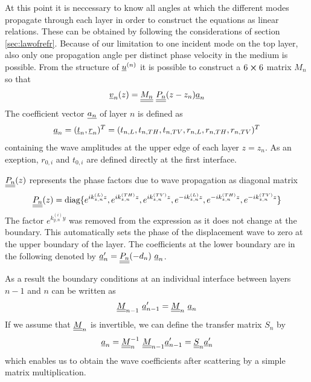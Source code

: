 At this point it is neccessary to know all angles at which the different modes
propagate through each layer in order to construct the equations as linear
relations. These can be obtained by following the considerations of section
\ref{sec:lawofrefr}.  Because of our limitation to one incident mode on the top
layer, also only one propagation angle per distinct phase velocity in the
medium is possible. From the structure of
$\underline{u}^{(n)}$ it is possible to construct a $6\cross6$ matrix $M_n$ so that
\begin{equation}
    \uline{v}_n(z) = \uuline{M_n}\ \uuline{P_n}(z-z_n)\uline{a}_n
\end{equation}
The coefficient vector $\underline{a_n}$ of layer $n$ is defined as
\begin{equation}
    \underline{a}_n = (\underline{t}_n, \underline{r}_n)^T	= (t_{n,L}, t_{n,TH}, t_{n,TV},
    r_{n,L}, r_{n,TH}, r_{n,TV})^T
\end{equation}
containing the wave amplitudes at the upper edge of each layer $z = z_n$. As an
exeption, $r_{0,i}$ and $t_{0,i}$ are defined directly at the first interface.

$\underline{\underline{P_n}}(z)$ represents the phase factors due to wave propagation
as diagonal matrix
\begin{equation} \label{eq:PmatTMM}
    \underline{\underline{P_n}}(z) = \text{diag}\{ e^{ik_{z,n}^{(L)}z},
    e^{ik_{z,n}^{(TH)}z},
    e^{ik_{z,n}^{(TV)}z}, e^{-ik_{z,n}^{(L)}z}, e^{-ik_{z,n}^{(TH)}z},
    e^{-ik_{z,n}^{(TV)}z}\}
\end{equation}
The factor $e^{k_{y,n}^{(i)} y}$ was removed from the expression as it does not
change at the boundary. This automatically sets the phase of the displacement
wave to zero at the upper boundary of the layer. The coefficients at the lower
boundary are in the following denoted by $\underline{a}_n^\prime =
    \underline{\underline{P_n}}(-d_n)\ \underline{a}_n$.

As a result the boundary conditions at an individual interface between layers
$n-1$ and $n$ can be written as
\begin{equation}
    \uuline{M}_{n-1}\ \uline{a}_{n-1}^\prime = \uuline{M}_{n}\ \uline{a}_{n}
\end{equation}
If we assume that $\underline{\underline{M}}_{n}$ is invertible, we can define the
transfer matrix $S_n$ by
\begin{equation} \label{eq:defSn}
    \underline{a}_{n} = \underline{\underline{M}}_{n}^{-1}\ \underline{\underline{M}}_{n-1}
    \underline{a}_{n-1}^\prime
    = \underline{\underline{S}}_n \underline{a}_n^\prime
\end{equation}
which enables us to obtain the wave coefficients after scattering by a simple
matrix multiplication.

